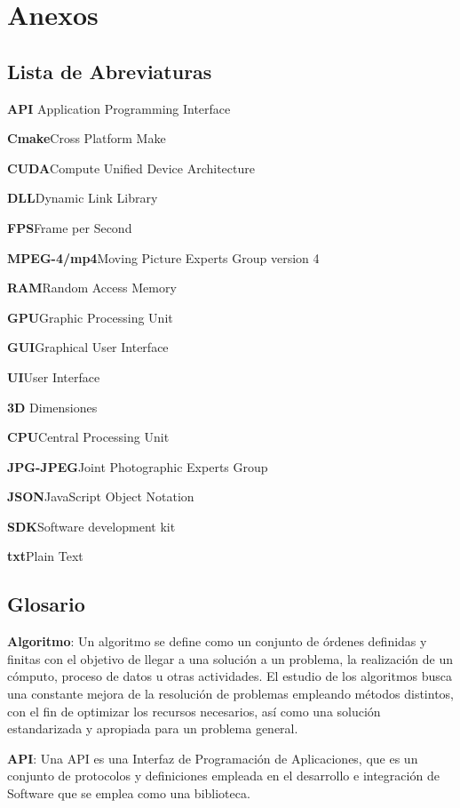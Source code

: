 \chapter{Anexos}

\section{Lista de Abreviaturas}

\textbf{API} \tab Application Programming Interface

\textbf{Cmake}\tab	Cross Platform Make

\textbf{CUDA}\tab  Compute Unified Device Architecture

\textbf{DLL}\tab   Dynamic Link Library

\textbf{FPS}\tab  Frame per Second

\textbf{MPEG-4/mp4}\tab  Moving Picture Experts Group version 4

\textbf{RAM}\tab  Random Access Memory

\textbf{GPU}\tab Graphic Processing Unit

\textbf{GUI}\tab  Graphical User Interface

\textbf{UI}\tab User Interface

\textbf{3D} Dimensiones

\textbf{CPU}\tab Central Processing Unit

\textbf{JPG-JPEG}\tab  Joint Photographic Experts Group 

\textbf{JSON}\tab  JavaScript Object Notation

\textbf{SDK}\tab  Software development kit

\textbf{txt}\tab  Plain Text


\newpage
\section{Glosario}


\textbf{Algoritmo}: Un algoritmo se define como un conjunto de órdenes definidas y finitas con el objetivo de llegar a una solución a un problema, la realización de un cómputo, proceso de datos u otras actividades. El estudio de los algoritmos busca una constante mejora de la resolución de problemas empleando métodos distintos, con el fin de optimizar los recursos necesarios, así como una solución estandarizada y apropiada para un problema general.

\textbf{API}: Una API es una Interfaz de Programación de Aplicaciones, que es un conjunto de protocolos y definiciones empleada en el desarrollo e integración de Software que se emplea como una biblioteca.

